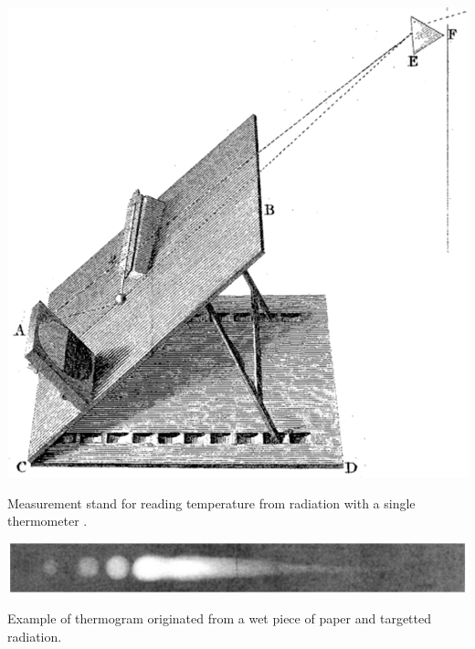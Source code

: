 \begin{marginfigure}[.15cm]
	\includegraphics{figs/fundamentals/herschel_decomposition.png}
	\caption{Measurement stand for reading temperature from radiation with a single thermometer \cite{minkina_how_2021}.}
	\label{fig:herschel_decomposition}
\end{marginfigure}
\begin{marginfigure}[7cm]
	\includegraphics{figs/fundamentals/infrared_absorption.png}
	\caption{Example of thermogram originated from a wet piece of paper and targetted radiation.}
	\label{fig:infrared_absorption}
\end{marginfigure}
